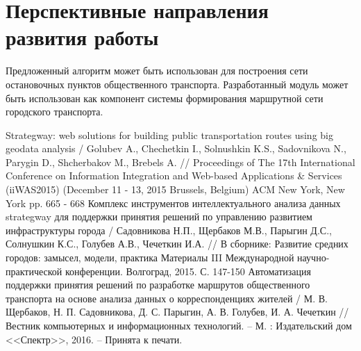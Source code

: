 \section{Перспективные направления развития работы}
Предложенный алгоритм может быть использован для построения сети остановочных пунктов общественного транспорта.
Разработанный модуль может быть использован как компонент системы формирования маршрутной сети городского транспорта.

\renewcommand{\bibname}{Публикации по теме диссертации}
\begin{thebibliography}{10}
     Strategway: web solutions for building public transportation routes using big geodata 
        analysis / Golubev A., Chechetkin I., Solnushkin K.S., Sadovnikova N., Parygin D., Shcherbakov M., 
        Brebels A. // Proceedings of The 17th International Conference on Information Integration and 
        Web-based Applications \& Services (iiWAS2015) (December 11 - 13, 2015 Brussels, Belgium) 
        ACM New York, New York pp. 665 - 668
     Комплекс инструментов интеллектуального анализа данных strategway для поддержки 
        принятия решений по управлению развитием инфраструктуры города / Садовникова Н.П., Щербаков М.В., 
        Парыгин Д.С., Солнушкин К.С., Голубев А.В., Чечеткин И.А. // В сборнике: Развитие средних 
        городов: замысел, модели, практика Материалы III Международной научно-практической конференции. 
        Волгоград, 2015. С. 147-150
     Автоматизация поддержки принятия решений по разработке маршрутов общественного 
        транспорта на основе анализа данных о корреспонденциях жителей / М. В. Щербаков, 
        Н. П. Садовникова, Д. С. Парыгин, А. В. Голубев, И. А. Чечеткин // Вестник компьютерных и 
        информационных технологий. -- М. : Издательский дом <<Спектр>>, 2016. -- Принята к печати.
\end{thebibliography}